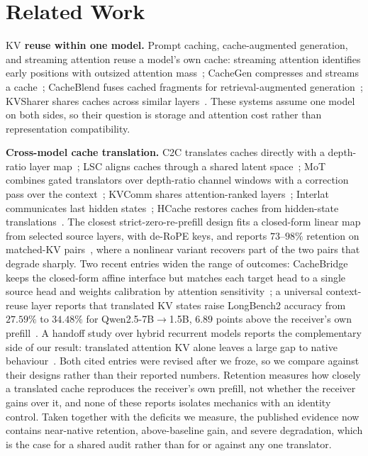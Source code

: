 \documentclass[10pt]{article}
\newcommand{\kv}{\ensuremath{\mathrm{KV}}}
\begin{document}

\section{Related Work}
\label{sec:survey}

\textbf{\kv{} reuse within one model.} Prompt caching, cache-augmented
generation, and streaming attention reuse a model's own cache: streaming
attention identifies early positions with outsized attention
mass~\citep{streamingsink2023}; CacheGen compresses and streams a
cache~\citep{cachegen2024}; CacheBlend fuses cached fragments for
retrieval-augmented generation~\citep{cacheblend2025}; KVSharer shares caches
across similar layers~\citep{kvsharer2024}. These systems assume one model on
both sides, so their question is storage and attention cost rather than
representation compatibility.

\textbf{Cross-model cache translation.} C2C translates caches directly with a
depth-ratio layer map~\citep{c2c2025}; LSC aligns caches through a shared latent
space~\citep{lsc2026}; MoT combines gated translators over depth-ratio channel
windows with a correction pass over the context~\citep{mot2026}; KVComm shares
attention-ranked layers~\citep{kvcomm2025}; Interlat communicates last hidden
states~\citep{interlat2025}; HCache restores caches from hidden-state
translations~\citep{hcache2025}. The closest strict-zero-re-prefill design fits
a closed-form linear map from selected source layers, with de-RoPE keys, and
reports $73$--$98\%$ retention on matched-\kv{} pairs~\citep{heo2026}, where a
nonlinear variant recovers part of the two pairs that degrade sharply.
Two recent entries widen the range of outcomes: CacheBridge keeps the
closed-form affine interface but matches each target head to a single source
head and weights calibration by attention sensitivity~\citep{cachebridge2026}; a
universal context-reuse layer reports that translated \kv{} states raise
LongBench2 accuracy from $27.59\%$ to $34.48\%$ for Qwen2.5-7B$\to$1.5B, $6.89$
points above the receiver's own prefill~\citep{contextreuse2026}. A handoff study
over hybrid recurrent models reports the complementary side of our result:
translated attention \kv{} alone leaves a large gap to native
behaviour~\citep{latentport2026}. Both cited entries were revised after we
froze, so we compare against their designs rather than their reported numbers.
Retention measures how closely a translated cache reproduces the receiver's own
prefill, not whether the receiver gains over it, and none of these reports
isolates mechanics with an identity control.
Taken together with the deficits we measure, the published evidence now
contains near-native retention, above-baseline gain, and severe degradation,
which is the case for a shared audit rather than for or against any one
translator.
\end{document}
